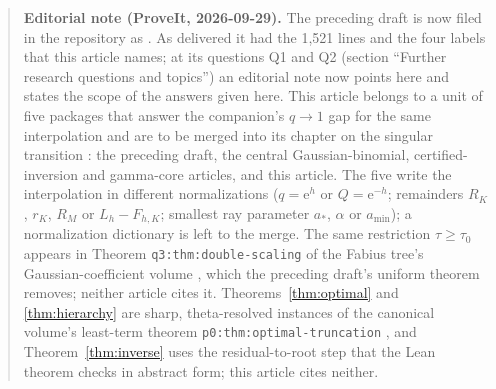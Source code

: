 \documentclass[11pt,a4paper]{article}
\numberwithin{equation}{section}
\theoremstyle{definition}\newtheorem{definition}[theorem]{Definition}
\theoremstyle{remark}\newtheorem{remark}[theorem]{Remark}
\newcommand{\e}{\mathrm e}
\begin{document}
\begin{quote}\small
\textbf{Editorial note (ProveIt, 2026-09-29).}
The preceding draft \cite{prior} is now filed in the repository as
\cite{ed:siblings}. As delivered it had the 1,521 lines and the four labels
that this article names; at its questions Q1 and Q2 (section ``Further
research questions and topics'') an editorial note now points here and
states the scope of the answers given here. This article belongs to a unit of five
packages that answer the companion's $q\to1$ gap for the same interpolation
and are to be merged into its chapter on the singular transition
\cite{ed:siblings}: the preceding draft, the central Gaussian-binomial,
certified-inversion and gamma-core articles, and this article.
The five write the interpolation in different normalizations ($q=\e^h$ or $Q=\e^{-h}$; remainders $R_K$, $r_K$, $R_M$ or $L_h-F_{h,K}$; smallest ray parameter $a_*$, $\alpha$ or $a_{\min}$); a normalization dictionary is left to the merge.
The same restriction $\tau\ge\tau_0$ appears in Theorem
\texttt{q3:thm:double-scaling} of the Fabius tree's Gaussian-coefficient
volume \cite{ed:gcc}, which the preceding draft's uniform theorem removes;
neither article cites it. Theorems~\ref{thm:optimal} and
\ref{thm:hierarchy} are sharp, theta-resolved instances of the canonical
volume's least-term theorem \texttt{p0:thm:optimal-truncation}
\cite{ed:tai}, and Theorem~\ref{thm:inverse} uses the residual-to-root step
that the Lean theorem 
\cite{ed:lean} checks in abstract form; this article cites neither.
\end{quote}
\end{document}
